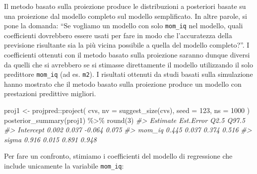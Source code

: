 \documentclass[
  10pt,
  italian,
  a4paper,
  extrafontsizes,onecolumn,openright
  ]{memoir}
\newenvironment{Shaded}{\begin{snugshade}}{\end{snugshade}}
\newcommand{\AttributeTok}[1]{\textcolor[rgb]{0.77,0.63,0.00}{#1}}
\newcommand{\CommentTok}[1]{\textcolor[rgb]{0.56,0.35,0.01}{\textit{#1}}}
\newcommand{\DecValTok}[1]{\textcolor[rgb]{0.00,0.00,0.81}{#1}}
\newcommand{\FunctionTok}[1]{\textcolor[rgb]{0.00,0.00,0.00}{#1}}
\newcommand{\NormalTok}[1]{#1}
\newcommand{\OtherTok}[1]{\textcolor[rgb]{0.56,0.35,0.01}{#1}}
\newcommand{\SpecialCharTok}[1]{\textcolor[rgb]{0.00,0.00,0.00}{#1}}
\theoremstyle{definition}
\theoremstyle{definition}
\theoremstyle{definition}
\theoremstyle{definition}
\theoremstyle{remark}
\begin{document}
Il metodo basato sulla proiezione produce le distribuzioni a posteriori basate su una proiezione dal modello completo sul modello semplificato. In altre parole, si pone la domanda: ``Se vogliamo un modello con solo \texttt{mom\_iq} nel modello, quali coefficienti dovrebbero essere usati per fare in modo che l'accuratezza della previsione risultante sia la più vicina possibile a quella del modello completo?''. I coefficienti ottenuti con il metodo basato sulla proiezione saranno dunque diversi da quelli che si avrebbero se si stimasse direttamente il modello utilizzando il solo predittore \texttt{mom\_iq} (ad es. \texttt{m2}). I risultati ottenuti da studi basati sulla simulazione hanno mostrato che il metodo basato sulla proiezione produce un modello con prestazioni predittive migliori.

\begin{Shaded}
\begin{Highlighting}[]
\NormalTok{proj1 }\OtherTok{\textless{}{-}}\NormalTok{ projpred}\SpecialCharTok{::}\FunctionTok{project}\NormalTok{(}
\NormalTok{  cvs,}
  \AttributeTok{nv =} \FunctionTok{suggest\_size}\NormalTok{(cvs),}
  \AttributeTok{seed =} \DecValTok{123}\NormalTok{,}
  \AttributeTok{ns =} \DecValTok{1000}
\NormalTok{)}
\FunctionTok{posterior\_summary}\NormalTok{(proj1) }\SpecialCharTok{\%\textgreater{}\%}
  \FunctionTok{round}\NormalTok{(}\DecValTok{3}\NormalTok{)}
\CommentTok{\#\textgreater{}           Estimate Est.Error   Q2.5 Q97.5}
\CommentTok{\#\textgreater{} Intercept    0.002     0.037 {-}0.064 0.075}
\CommentTok{\#\textgreater{} mom\_iq       0.445     0.037  0.374 0.516}
\CommentTok{\#\textgreater{} sigma        0.916     0.015  0.891 0.948}
\end{Highlighting}
\end{Shaded}

\indent

Per fare un confronto, stimiamo i coefficienti del modello di regressione che include unicamente la variabile \texttt{mom\_iq}:
\end{document}
